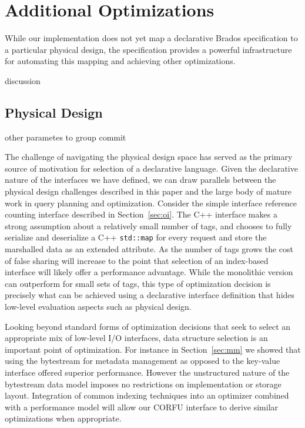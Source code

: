 \section{Additional Optimizations}
\label{sec:opts}

While our implementation does not yet map a declarative Brados specification
to a particular physical design, the specification provides a powerful
infrastructure for automating this mapping and achieving other optimizations.

discussion

\subsection{Physical Design}

other parametes to group commit

The challenge of navigating the physical design space
has served as the primary source of motivation for selection of a declarative
language. Given the declarative nature of the interfaces we have defined,
we can draw parallels between the physical design challenges described in this
paper and the
large body of mature work in query planning and optimization. Consider the
simple interface reference counting interface described in
Section~\ref{sec:oi}.  The C++ interface makes a strong assumption about a
relatively small number of tags, and chooses to fully serialize and
deserialize a C++ \texttt{std::map} for every request and store the marshalled
data as an extended attribute.  As the number of tags grows the cost of false
sharing will increase to the point that selection of an index-based interface
will likely offer a performance advantage. While the monolithic version can
outperform for small sets of tags, this type of optimization decision is
precisely what can be achieved using a declarative interface definition that
hides low-level evaluation aspects such as physical design.

Looking beyond standard forms of optimization decisions that seek to select
an appropriate mix of low-level I/O interfaces, data structure selection is an
important point of optimization. For instance in Section~\ref{sec:mm} we
showed that using the bytestream for metadata management as opposed to the
key-value interface offered superior performance. However the unstructured
nature of the bytestream data model imposes no restrictions on implementation
or storage layout. Integration of common indexing techniques into an optimizer
combined with a performance model will allow our CORFU interface to derive
similar optimizations when appropriate.


